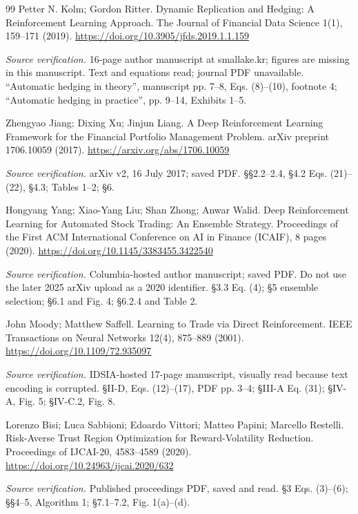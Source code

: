 \documentclass[11pt,a4paper]{article}
\theoremstyle{plain}
\theoremstyle{definition}
\begin{document}
\begin{thebibliography}{99}
 Petter N. Kolm; Gordon Ritter. Dynamic Replication and Hedging: A Reinforcement Learning Approach. The Journal of Financial Data Science 1(1), 159--171 (2019). \url{https://doi.org/10.3905/jfds.2019.1.1.159}
\par\smallskip\noindent\emph{Source verification.} 16-page author manuscript at smallake.kr; figures are missing in this manuscript. Text and equations read; journal PDF unavailable. ``Automatic hedging in theory'', manuscript pp. 7--8, Eqs. (8)--(10), footnote 4; ``Automatic hedging in practice'', pp. 9--14, Exhibits 1--5.

 Zhengyao Jiang; Dixing Xu; Jinjun Liang. A Deep Reinforcement Learning Framework for the Financial Portfolio Management Problem. arXiv preprint 1706.10059 (2017). \url{https://arxiv.org/abs/1706.10059}
\par\smallskip\noindent\emph{Source verification.} arXiv v2, 16 July 2017; saved PDF. \S{}\S{}2.2--2.4, \S{}4.2 Eqs. (21)--(22), \S{}4.3; Tables 1--2; \S{}6.

 Hongyang Yang; Xiao-Yang Liu; Shan Zhong; Anwar Walid. Deep Reinforcement Learning for Automated Stock Trading: An Ensemble Strategy. Proceedings of the First ACM International Conference on AI in Finance (ICAIF), 8 pages (2020). \url{https://doi.org/10.1145/3383455.3422540}
\par\smallskip\noindent\emph{Source verification.} Columbia-hosted author manuscript; saved PDF. Do not use the later 2025 arXiv upload as a 2020 identifier. \S{}3.3 Eq. (4); \S{}5 ensemble selection; \S{}6.1 and Fig. 4; \S{}6.2.4 and Table 2.

 John Moody; Matthew Saffell. Learning to Trade via Direct Reinforcement. IEEE Transactions on Neural Networks 12(4), 875--889 (2001). \url{https://doi.org/10.1109/72.935097}
\par\smallskip\noindent\emph{Source verification.} IDSIA-hosted 17-page manuscript, visually read because text encoding is corrupted. \S{}II-D, Eqs. (12)--(17), PDF pp. 3--4; \S{}III-A Eq. (31); \S{}IV-A, Fig. 5; \S{}IV-C.2, Fig. 8.

 Lorenzo Bisi; Luca Sabbioni; Edoardo Vittori; Matteo Papini; Marcello Restelli. Risk-Averse Trust Region Optimization for Reward-Volatility Reduction. Proceedings of IJCAI-20, 4583--4589 (2020). \url{https://doi.org/10.24963/ijcai.2020/632}
\par\smallskip\noindent\emph{Source verification.} Published proceedings PDF, saved and read. \S{}3 Eqs. (3)--(6); \S{}\S{}4--5, Algorithm 1; \S{}7.1--7.2, Fig. 1(a)--(d).


\end{thebibliography}
\end{document}
